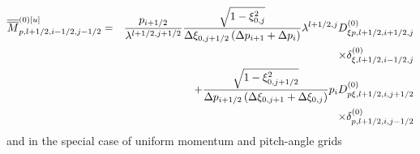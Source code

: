 \begin{eqnarray}
\overline{\overline{M}}_{p,l+1/2,i-1/2,j-1/2}^{\left( 0\right) \left[ u%
\right] } &=&\frac{p_{i+1/2}}{\lambda ^{l+1/2,j+1/2}}\frac{\sqrt{1-\xi
_{0,j}^{2}}}{\Delta \xi _{0,j+1/2}\left( \Delta p_{i+1}+\Delta p_{i}\right) }%
\lambda ^{l+1/2,j}D_{\xi p,l+1/2,i+1/2,j}^{\left( 0\right) }  \notag \\
&&\times \delta _{\xi ,l+1/2,i-1/2,j}^{\left( 0\right) }  \notag \\
&&+\frac{\sqrt{1-\xi _{0,j+1/2}^{2}}}{\Delta p_{i+1/2}\left( \Delta \xi
_{0,j+1}+\Delta \xi _{0,j}\right) }p_{i}D_{p\xi ,l+1/2,i,j+1/2}^{\left(
0\right) }  \notag \\
&&\times \delta _{p,l+1/2,i,j-1/2}^{\left( 0\right) }
\end{eqnarray}%
and in the special case of uniform momentum and pitch-angle grids

